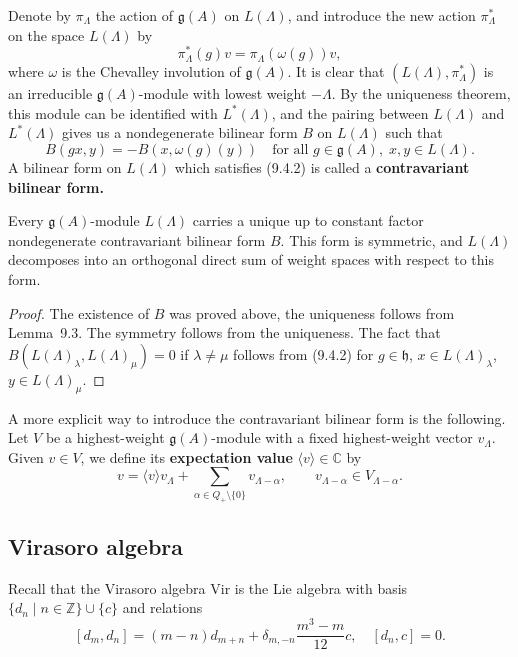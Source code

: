 \documentclass[12pt]{article}
\begin{document}
Denote by $\pi_\Lambda$ the action of $\mathfrak{g}(A)$ on $L(\Lambda)$, and introduce
the new action $\pi_\Lambda^*$ on the space $L(\Lambda)$ by
\begin{equation}
\pi_\Lambda^*(g)v = \pi_\Lambda(\omega(g))v,
\tag{9.4.1}
\end{equation}
where $\omega$ is the Chevalley involution of $\mathfrak{g}(A)$.
It is clear that $(L(\Lambda), \pi_\Lambda^*)$ is an irreducible
$\mathfrak{g}(A)$-module with lowest weight $-\Lambda$.
By the uniqueness theorem, this module can be identified with $L^*(\Lambda)$,
and the pairing between $L(\Lambda)$ and $L^*(\Lambda)$ gives us a nondegenerate
bilinear form $B$ on $L(\Lambda)$ such that
\begin{equation}
B(gx, y) = -B(x, \omega(g)(y))
\quad
\text{for all } g \in \mathfrak{g}(A),\; x,y \in L(\Lambda).
\tag{9.4.2}
\end{equation}
A bilinear form on $L(\Lambda)$ which satisfies (9.4.2) is called a 
\textbf{contravariant bilinear form.}

\begin{proposition}[9.4]
Every $\mathfrak{g}(A)$-module $L(\Lambda)$ carries a unique up to constant factor
nondegenerate contravariant bilinear form $B$. This form is symmetric, and
$L(\Lambda)$ decomposes into an orthogonal direct sum of weight spaces with respect to
this form.
\end{proposition}

\begin{proof}
The existence of $B$ was proved above, the uniqueness follows from Lemma~9.3.
The symmetry follows from the uniqueness. The fact that 
$B(L(\Lambda)_\lambda, L(\Lambda)_\mu) = 0$ if $\lambda \neq \mu$ 
follows from (9.4.2) for $g \in \mathfrak{h}$, $x \in L(\Lambda)_\lambda$, 
$y \in L(\Lambda)_\mu$.
\end{proof}

A more explicit way to introduce the contravariant bilinear form is the following.
Let $V$ be a highest-weight $\mathfrak{g}(A)$-module with a fixed highest-weight
vector $v_\Lambda$. Given $v \in V$, we define its \textbf{expectation value}
$\langle v \rangle \in \mathbb{C}$ by
\[
v = \langle v \rangle v_\Lambda + \sum_{\alpha \in Q_+ \setminus \{0\}} v_{\Lambda - \alpha},
\qquad
v_{\Lambda - \alpha} \in V_{\Lambda - \alpha}.
\]
\subsection{Virasoro algebra}
Recall that the Virasoro algebra $\mathrm{Vir}$ is the Lie algebra with basis
$\{d_n \mid n \in \mathbb{Z}\} \cup \{c\}$ and relations
\[[d_m, d_n] = (m-n)d_{m+n} + \delta_{m,-n} \frac{m^3 - m}{12} c, \quad [d_n, c] = 0.\]
\end{document}
